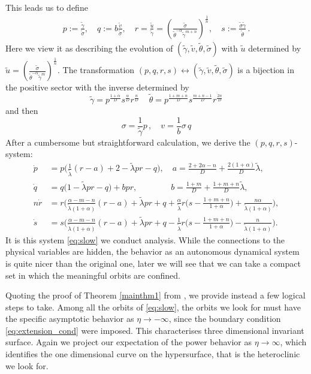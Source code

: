 \documentclass[a4paper,11pt]{article}
\def\tg{{\tilde{\gamma}}}
\def\tv{{\tilde{v}}}
\def\tth{{\tilde{\theta}}}
\def\ts{{\tilde{\sigma}}}
\def\tu{{\tilde{u}}}
\theoremstyle{remark}
\begin{document}
This leads us to define
\begin{equation}\label{eq:pqrdef}
 \begin{aligned}
  p :=\frac{\tg}{\ts}, \quad q :=b \frac{\tv}{\ts},  \quad r = \frac{\tu}{\tg} = \left ( \frac{\ts}{ \tth^{-\alpha} \tg^{m+n}} \right )^\frac{1}{n}  , \quad s := \frac{\ts\tg}{\tth} \, .
 \end{aligned}
\end{equation}
Here we view it as describing the evolution of $(\tg,\tv,\tth,\ts)$ with $\tu$ determined by $\tu = \left ( \frac{\ts}{ \tth^{-\alpha} \tg^m} \right )^\frac{1}{n}$. The transformation $(p,q,r,s) \leftrightarrow (\tg,\tv, \tth,\ts)$ is a bijection in the positive sector with the inverse determined by
$$
\tg = p^\frac{1+\alpha}{D} s^\frac{\alpha}{D} r^\frac{n}{D} \, \quad \tth = p^\frac{1+m+n}{D} s^\frac{m+n-1}{D} r^\frac{2n}{D}
$$
and then
$$
\sigma = \frac{1}{\tg} p \, , \quad v = \frac{1}{b} \sigma \, q
$$
After a cumbersome but straightforward calculation, we derive the $(p,q,r,s)$-system:
\begin{equation}\label{eq:slow} \tag{S}
 \begin{aligned}
 \dot{p} &=p\Big(\frac{1}{\tilde\lambda}(r-a) + 2- \tilde\lambda p r -q\Big), \quad a=\frac{2+2\alpha-n}{D} + \frac{2(1 + \alpha)}{D}\tilde\lambda,\\
 \dot{q} &=q\Big(1 -\tilde\lambda p r -q\Big) + b p r, \quad \quad \quad \quad b=\frac{1+m}{D} + \frac{1+m+n}{D}\tilde\lambda,\\
 n\dot{r} &=r\Big(\frac{\alpha-m-n}{\tilde\lambda(1+\alpha)}(r-a) + \tilde\lambda pr + q +\frac{\alpha}{\tilde\lambda}r\big(s- \frac{1+m+n}{1+\alpha}\big) + \frac{n\alpha}{\tilde\lambda(1+\alpha)}\Big),\\
 \dot{s} &=s\Big(\frac{\alpha-m-n}{\tilde\lambda(1+\alpha)}(r-a) + \tilde\lambda pr + q - \frac{1}{\tilde\lambda}r\big(s- \frac{1+m+n}{1+\alpha}\big) - \frac{n}{\tilde\lambda(1+\alpha)}\Big).
 \end{aligned}
\end{equation}
It is this system \eqref{eq:slow} we conduct analysis. While the connections to the physical variables are hidden, the behavior as an autonomous dynamical system is quite nicer than the original one, later we will see that we can take a compact set in which the meaningful orbits are confined.

Quoting the proof of Theorem \ref{mainthm1} from \cite{LKT17}, we provide instead a few logical steps to take. Among all the orbits of \eqref{eq:slow}, the orbits we look for must have the specific asymptotic behavior as $\eta \rightarrow -\infty$, since the boundary condition \eqref{eq:extension_cond} were imposed. This characterises three dimensional invariant surface. Again we project our expectation of the power behavior as $\eta \rightarrow \infty$, which identifies the one dimensional curve on the hypersurface, that is the heteroclinic we look for.
\end{document}
